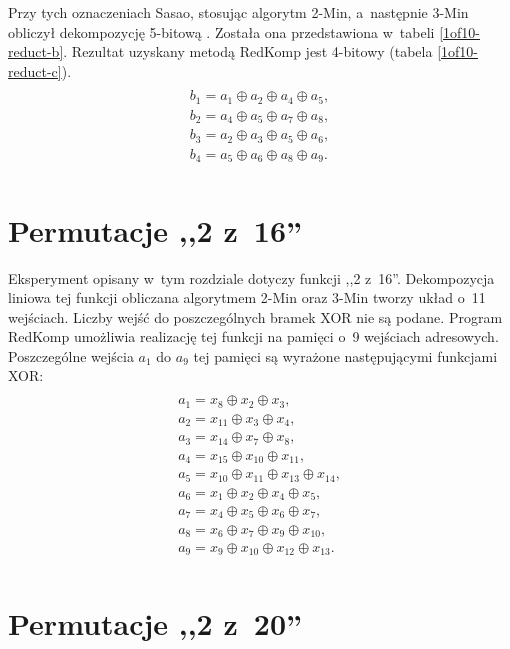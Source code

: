 Przy tych oznaczeniach Sasao,
stosując algorytm 2-Min,
a~następnie 3-Min obliczył dekompozycję 5-bitową \cite{sasao-s-min}.
Została ona przedstawiona w~tabeli \ref{1of10-reduct-b}.
Rezultat uzyskany metodą RedKomp jest 4-bitowy (tabela \ref{1of10-reduct-c}).
\begin{multline} \\
b_1 = a_1 \oplus a_2 \oplus a_4 \oplus a_5, \\
b_2 = a_4 \oplus a_5 \oplus a_7 \oplus a_8, \\
b_3 = a_2 \oplus a_3 \oplus a_5 \oplus a_6, \\
b_4 = a_5 \oplus a_6 \oplus a_8 \oplus a_9. \\
\end{multline}




\section{Permutacje ,,2 z~16''}

Eksperyment opisany w~tym rozdziale dotyczy funkcji ,,2 z~16''.
Dekompozycja liniowa tej funkcji obliczana algorytmem 2-Min oraz 3-Min \cite{sasao-s-min} tworzy układ o~11 wejściach.
Liczby wejść do poszczególnych bramek XOR nie są podane.
Program RedKomp umożliwia realizację tej funkcji na pamięci o~9 wejściach adresowych.
Poszczególne wejścia $a_1$ do $a_9$ tej pamięci są wyrażone następującymi funkcjami XOR:
\begin{multline} \\
a_1 = x_8 \oplus x_2 \oplus x_3, \\
a_2 = x_{11} \oplus x_3 \oplus x_4, \\
a_3 = x_{14} \oplus x_7 \oplus x_8, \\
a_4 = x_{15} \oplus x_{10} \oplus x_{11}, \\
a_5 = x_{10} \oplus x_{11} \oplus x_{13} \oplus x_{14}, \\
a_6 = x_1 \oplus x_2 \oplus x_4 \oplus x_5, \\
a_7 = x_4 \oplus x_5 \oplus x_6 \oplus x_7, \\
a_8 = x_6 \oplus x_7 \oplus x_9 \oplus x_{10}, \\
a_9 = x_9 \oplus x_{10} \oplus x_{12} \oplus x_{13}. \\
\end{multline}

\section{Permutacje ,,2 z~20''}

